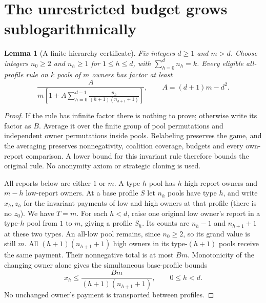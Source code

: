 \documentclass[11pt]{article}
\newtheorem{lemma}[theorem]{Lemma}
\theoremstyle{definition}\newtheorem{definition}[theorem]{Definition}
\theoremstyle{remark}\newtheorem{remark}[theorem]{Remark}
\begin{document}
\section{The unrestricted budget grows sublogarithmically}\label{sec:lower}
\begin{lemma}[A finite hierarchy certificate]\label{lem:hierarchy}
Fix integers $d\ge1$ and $m>d$. Choose integers $n_0\ge2$ and
$n_h\ge1$ for $1\le h\le d$, with $\sum_{h=0}^d n_h=k$.
Every eligible all-profile rule on $k$ pools of $m$ owners has factor at least
\begin{equation}\label{eq:hierarchy}
 \frac{A}{m\left[1+A\displaystyle\sum_{h=0}^{d-1}
          \frac{n_h}{(h+1)(n_{h+1}+1)}\right]},
 \qquad A=(d+1)m-d^2.
\end{equation}
\end{lemma}
\begin{proof}
If the rule has infinite factor there is nothing to prove; otherwise write
its factor as $B$. Average it over the finite group of pool permutations and
independent owner permutations inside pools. Relabeling preserves the game,
and the averaging preserves nonnegativity, coalition coverage, budgets and
every own-report comparison. A lower bound for this invariant rule therefore
bounds the original rule. No anonymity axiom or strategic cloning is used.

All reports below are either $1$ or $m$. A type-$h$ pool has $h$ high-report
owners and $m-h$ low-report owners. At a base profile $S$ let $n_h$ pools
have type $h$, and write $x_h,z_h$ for the invariant payments of low and
high owners at that profile (there is no $z_0$). We have $T=m$.
For each $h<d$, raise one original low owner's report in a type-$h$ pool
from $1$ to $m$, giving a profile $S_h$. Its counts are $n_h-1$ and
$n_{h+1}+1$ at these two types. An all-low pool remains, since $n_0\ge2$,
so its grand value is still $m$.
All $(h+1)(n_{h+1}+1)$ high owners in its type-$(h+1)$ pools receive the
same payment. Their nonnegative total is at most $Bm$. Monotonicity of
the changing owner alone gives the simultaneous base-profile bounds
\begin{equation}\label{eq:exports}
 x_h\le \frac{Bm}{(h+1)(n_{h+1}+1)},\qquad 0\le h<d.
\end{equation}
No unchanged owner's payment is transported between profiles.


\end{proof}
\end{document}
